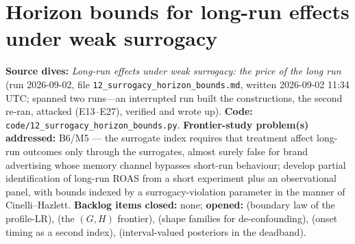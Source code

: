 \chapter{Horizon bounds for long-run effects under weak surrogacy}
\label{ch:surrogacy}

\begin{provenance}
\textbf{Source dives:}  \emph{Long-run effects under weak surrogacy: the price of the long run} (run 2026-09-02, file \texttt{12\_surrogacy\_horizon\_bounds.md}, written 2026-09-02 11:34 UTC; spanned two runs---an interrupted run built the constructions, the second re-ran, attacked (E13--E27), verified and wrote up).
\textbf{Code:} \texttt{code/12\_surrogacy\_horizon\_bounds.py}.
\textbf{Frontier-study problem(s) addressed:} B6/M5 --- the surrogate index requires that treatment affect long-run outcomes only through the surrogates, almost surely false for brand advertising whose memory channel bypasses short-run behaviour; develop partial identification of long-run ROAS from a short experiment plus an observational panel, with bounds indexed by a surrogacy-violation parameter in the manner of Cinelli--Hazlett.
\textbf{Backlog items closed:} none; \textbf{opened:}  (boundary law of the profile-LR),  (the $(G,H)$ frontier),  (shape families for de-confounding),  (onset timing as a second index),  (interval-valued posteriors in the deadband).
\end{provenance}

